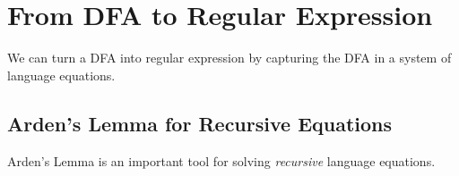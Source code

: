 \section{From DFA to Regular Expression}\label{re2fsasec}

We can turn a DFA into regular expression by capturing the DFA in a system of
language equations. 

\subsection{Arden's Lemma for Recursive Equations}

Arden's Lemma is an important tool for solving \emph{recursive} language equations.

